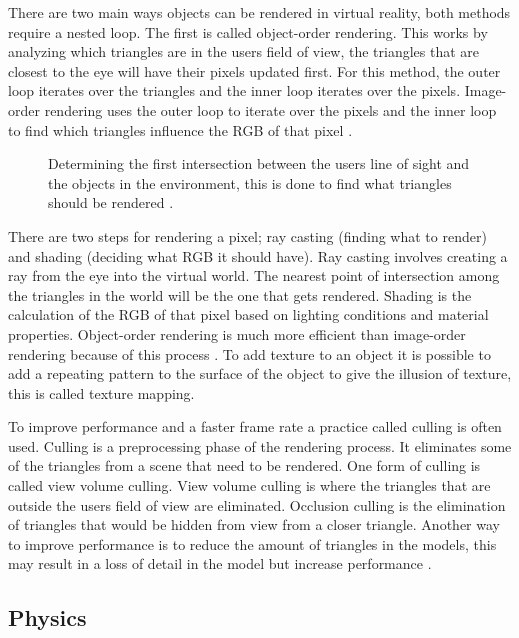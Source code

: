 There are two main ways objects can be rendered in virtual reality, both methods require a nested loop. The first is called object-order rendering. This works by analyzing which triangles are in the users field of view, the triangles that are closest to the eye will have their pixels updated first. For this method, the outer loop iterates over the triangles and the inner loop iterates over the pixels. Image-order rendering uses the outer loop to iterate over the pixels and the inner loop to find which triangles influence the RGB of that pixel \cite{LaValle2017}. 
\begin{figure}[!ht]
	\begin{center}
	\end{center}
	\caption{Determining the first intersection between the users line of sight and the objects in the environment, this is done to find what triangles should be rendered \cite{LaValle2017}.} \label{fig:raycasting}
\end{figure} There are two steps for rendering a pixel; ray casting (finding what to render) and shading (deciding what RGB it should have). Ray casting involves creating a ray from the eye into the virtual world. The nearest point of intersection among the triangles in the world will be the one that gets rendered. Shading is the calculation of the RGB of that pixel based on lighting conditions and material properties. Object-order rendering is much more efficient than image-order rendering because of this process \cite{LaValle2017}. To add texture to an object it is possible to add a repeating pattern to the surface of the object to give the illusion of texture, this is called texture mapping. 


To improve performance and a faster frame rate a practice called culling is often used. Culling is a preprocessing phase of the rendering process. It eliminates some of the triangles from a scene that need to be rendered. One form of culling is called view volume culling. View volume culling is where the triangles that are outside the users field of view are eliminated. Occlusion culling is the elimination of triangles that would be hidden from view from a closer triangle. Another way to improve performance is to reduce the amount of triangles in the models, this may result in a loss of detail in the model but increase performance \cite{LaValle2017}. 


\subsection{Physics}\label{physics}

